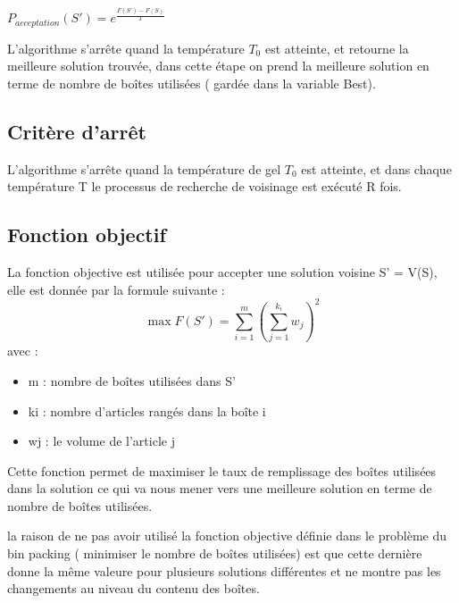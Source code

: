 \documentclass[12pt]{article}
\begin{document}
$ P_{acceptation}(S') = e^{\frac{F(S')-F(S)}{T}}$ \newline



L’algorithme s'arrête quand la température \emph{$T_{0}$} est atteinte, et retourne la meilleure solution trouvée,
 dans cette étape on prend la meilleure solution en terme de nombre de boîtes utilisées ( gardée dans la variable Best). 

\subsection{Critère d'arrêt}
L’algorithme s’arrête quand la température de gel \emph{$T_{0}$} est atteinte, et dans chaque température T le processus de recherche de voisinage est exécuté R fois.

\subsection{Fonction objectif}
La fonction objective est utilisée pour accepter une solution voisine S’ = V(S), elle est donnée par la formule suivante : 
\begin{equation}
    \max{F(S')} = \sum_{i=1}^m (\sum_{j=1}^{k_{i}} w_{j})^{2}
\end{equation}
avec : 
\begin{itemize}
\item m : nombre de boîtes utilisées dans S’ 
\item ki : nombre d’articles rangés dans la boîte i 
\item wj : le volume de l’article j 
\end{itemize}
Cette fonction permet de maximiser le taux de remplissage des boîtes utilisées dans la solution ce qui va nous mener vers une meilleure solution en terme de nombre de boîtes utilisées. 

la raison de ne pas avoir utilisé la fonction objective définie dans le problème du bin packing ( minimiser le nombre de boîtes utilisées) est que cette dernière donne la même valeure pour plusieurs solutions différentes et ne montre pas les changements au niveau du contenu des boîtes. 
\end{document}

